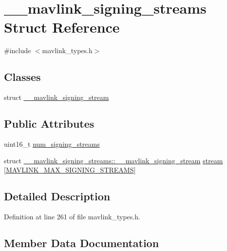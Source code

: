 \hypertarget{struct____mavlink__signing__streams}{}\section{\+\_\+\+\_\+mavlink\+\_\+signing\+\_\+streams Struct Reference}
\label{struct____mavlink__signing__streams}


{\ttfamily \#include $<$mavlink\+\_\+types.\+h$>$}

\subsection*{Classes}
\begin{DoxyCompactItemize}
\item 
struct \mbox{\hyperlink{struct____mavlink__signing__streams_1_1____mavlink__signing__stream}{\+\_\+\+\_\+mavlink\+\_\+signing\+\_\+stream}}
\end{DoxyCompactItemize}
\subsection*{Public Attributes}
\begin{DoxyCompactItemize}
\item 
uint16\+\_\+t \mbox{\hyperlink{struct____mavlink__signing__streams_a21844f3fe728695a8e33a4b003591979}{num\+\_\+signing\+\_\+streams}}
\item 
struct \mbox{\hyperlink{struct____mavlink__signing__streams_1_1____mavlink__signing__stream}{\+\_\+\+\_\+mavlink\+\_\+signing\+\_\+streams\+::\+\_\+\+\_\+mavlink\+\_\+signing\+\_\+stream}} \mbox{\hyperlink{struct____mavlink__signing__streams_a76b029e55c2ea2d8a90b7dd1c4776ffb}{stream}} \mbox{[}\mbox{\hyperlink{include__v2_80_2mavlink__types_8h_aa50fb9588340e4be3b9c17e95494282c}{M\+A\+V\+L\+I\+N\+K\+\_\+\+M\+A\+X\+\_\+\+S\+I\+G\+N\+I\+N\+G\+\_\+\+S\+T\+R\+E\+A\+MS}}\mbox{]}
\end{DoxyCompactItemize}


\subsection{Detailed Description}


Definition at line 261 of file mavlink\+\_\+types.\+h.



\subsection{Member Data Documentation}
\mbox{\label{struct____mavlink__signing__streams_a21844f3fe728695a8e33a4b003591979}} 
